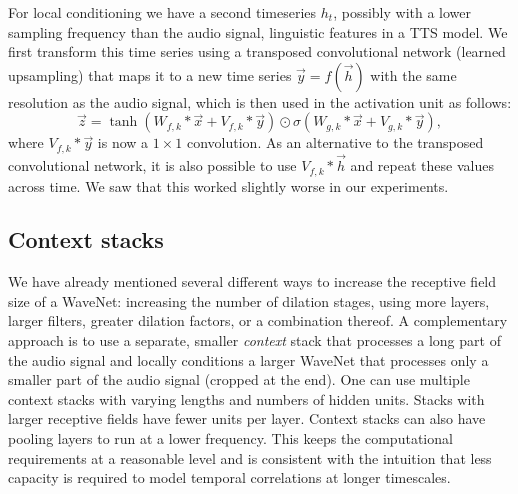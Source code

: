 For local conditioning we have a second timeseries $h_t$, possibly with a lower sampling frequency than the audio signal, \eg linguistic features in a TTS model. We first transform this time series using a transposed convolutional network (learned upsampling) that maps it to a new time series $\vec{y} = f(\vec{h})$ with the same resolution as the audio signal, which is then used in the activation unit as follows:
$$
\vec{z} = \tanh \left(W_{f, k} \ast \vec{x} + V_{f, k} \ast \vec{y}\right) \odot \sigma \left(W_{g, k} \ast \vec{x} + V_{g, k} \ast \vec{y}\right), \label{eq:local_conditioning}
$$
where $V_{f, k} \ast \vec{y}$ is now a $1\times 1$ convolution. As an alternative to the transposed convolutional network, it is also possible to use $V_{f, k} \ast \vec{h}$ and repeat these values across time. We saw that this worked slightly worse in our experiments.

\subsection{Context stacks}

We have already mentioned several different ways to increase the receptive field size of a WaveNet: increasing the number of dilation stages, using more layers, larger filters, greater dilation factors, or a combination thereof. A complementary approach is to use a separate, smaller \emph{context} stack that processes a long part of the audio signal and locally conditions a larger WaveNet that processes only a smaller part of the audio signal (cropped at the end). One can use multiple context stacks with varying lengths and numbers of hidden units. Stacks with larger receptive fields have fewer units per layer. Context stacks can also have pooling layers to run at a lower frequency. This keeps the computational requirements at a reasonable level and is consistent with the intuition that less capacity is required to model temporal correlations at longer timescales.

